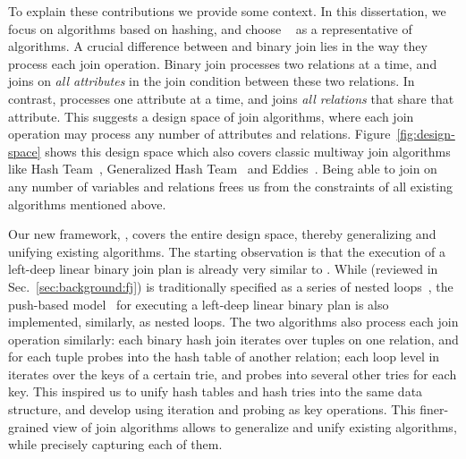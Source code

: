To explain these contributions we provide some context.
%
In this dissertation, we focus on algorithms based on hashing,
  and choose \GJ~\cite{DBLP:journals/sigmod/NgoRR13} as a representative of \WCOJ algorithms.
A crucial difference between \GJ and binary join lies 
  in the way they process each join operation. 
Binary join processes two relations at a time, 
  and joins on \emph{all attributes} 
  in the join condition between these two relations. 
In contrast, \GJ processes one attribute at a time, 
  and joins \emph{all relations} that share that attribute.
This suggests a design space of join algorithms, 
  where each join operation may process any 
  number of attributes and relations.
Figure~\ref{fig:design-space} shows this design space
  which also covers classic multiway join algorithms 
  like Hash Team~\cite{DBLP:conf/vldb/GraefeBC98}, 
  Generalized Hash Team~\cite{DBLP:conf/vldb/KemperKW99}
  and Eddies~\cite{DBLP:conf/sigmod/HellersteinA00}.
Being able to join on any number of variables and relations
  frees us from the constraints of all existing algorithms 
  mentioned above. 

Our new framework, \FJ,
  covers the entire design space, 
  thereby generalizing and unifying existing algorithms.
The starting observation is that the execution of a left-deep linear 
  binary join plan is already very similar to \GJ.
While \GJ (reviewed in Sec.~\ref{sec:background:fj}) is traditionally specified as a series of nested loops~\cite{DBLP:journals/sigmod/NgoRR13},
  the push-based model~\cite{DBLP:journals/pvldb/Neumann11,DBLP:journals/pvldb/KerstenLKNPB18} for executing a left-deep linear binary plan
  is also implemented, similarly, as nested loops.
The two algorithms also process each join operation similarly:
  each binary hash join iterates over tuples on one relation, 
  and for each tuple probes into the hash table of another relation;
  each loop level in \GJ iterates over the keys of a certain trie,
  and probes into several other tries for each key.
This inspired us to unify hash tables and hash tries into the same data structure, 
  and develop \FJ using iteration and probing as key operations.
This finer-grained view of join algorithms allows \FJ
  to generalize and unify existing algorithms,
  while precisely capturing each of them.

